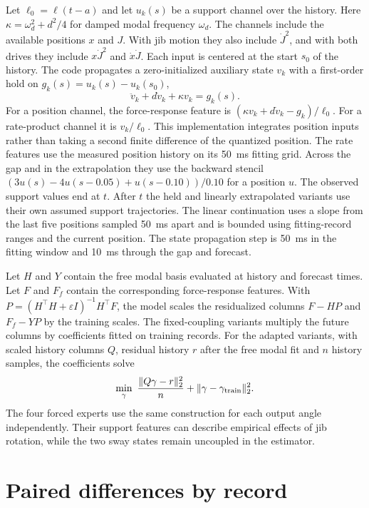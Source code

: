 Let $\ell_0=\ell(t-a)$ and let $u_k(s)$ be a support channel over the history. Here $\kappa=\omega_d^2+d^2/4$ for damped modal frequency $\omega_d$. The channels include the available positions $x$ and $J$. With jib motion they also include $\dot J^2$, and with both drives they include $x\dot J^2$ and $\dot x\dot J$. Each input is centered at the start $s_0$ of the history. The code propagates a zero-initialized auxiliary state $v_k$ with a first-order hold on $g_k(s)=u_k(s)-u_k(s_0)$,
\begin{equation}
 \ddot v_k+d\dot v_k+\kappa v_k=g_k(s).
\end{equation}
For a position channel, the force-response feature is $(\kappa v_k+d\dot v_k-g_k)/\ell_0$. For a rate-product channel it is $v_k/\ell_0$. This implementation integrates position inputs rather than taking a second finite difference of the quantized position. The rate features use the measured position history on its 50~ms fitting grid. Across the gap and in the extrapolation they use the backward stencil $(3u(s)-4u(s-0.05)+u(s-0.10))/0.10$ for a position $u$. The observed support values end at $t$. After $t$ the held and linearly extrapolated variants use their own assumed support trajectories. The linear continuation uses a slope from the last five positions sampled 50~ms apart and is bounded using fitting-record ranges and the current position. The state propagation step is 50~ms in the fitting window and 10~ms through the gap and forecast.

Let $H$ and $Y$ contain the free modal basis evaluated at history and forecast times. Let $F$ and $F_f$ contain the corresponding force-response features. With $P=(H^{\top}H+\varepsilon I)^{-1}H^{\top}F$, the model scales the residualized columns $F-HP$ and $F_f-YP$ by the training scales. The fixed-coupling variants multiply the future columns by coefficients fitted on training records. For the adapted variants, with scaled history columns $Q$, residual history $r$ after the free modal fit and $n$ history samples, the coefficients solve
\begin{equation}
 \min_\gamma\ \frac{\|Q\gamma-r\|_2^2}{n}
       +\|\gamma-\gamma_{\rm train}\|_2^2.
\end{equation}
The four forced experts use the same construction for each output angle independently. Their support features can describe empirical effects of jib rotation, while the two sway states remain uncoupled in the estimator.

\section{Paired differences by record}
\label{app:record-gaps}

